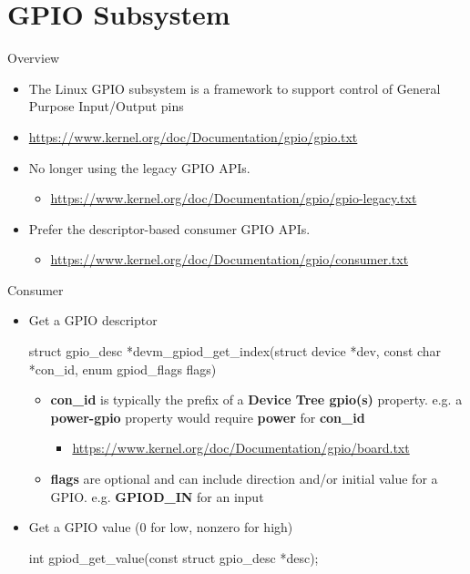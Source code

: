 \section{GPIO Subsystem}

\begin{frame}
   {Overview}

   \begin{itemize}
      \item
	      The Linux GPIO subsystem is a framework to support control of General Purpose Input/Output pins
      \item
		\url{https://www.kernel.org/doc/Documentation/gpio/gpio.txt}
      \item
	      No longer using the legacy GPIO APIs.
		   \begin{itemize}
			   \item 
				   \url{https://www.kernel.org/doc/Documentation/gpio/gpio-legacy.txt}
		   \end{itemize}
      \item
	      Prefer the descriptor-based consumer GPIO APIs.
		   \begin{itemize}
			   \item
				   \url{https://www.kernel.org/doc/Documentation/gpio/consumer.txt}
		   \end{itemize}
   \end{itemize}
\end{frame}

\begin{frame}
	{Consumer}

	\begin{itemize}
		\item
			Get a GPIO descriptor
			\begin{raw}
struct gpio_desc *devm_gpiod_get_index(struct device *dev,
				       const char *con_id,
			               enum gpiod_flags flags)
			\end{raw}
			\begin{itemize}
		\item
			\textbf{con\_id} is typically the prefix of a \textbf{Device Tree gpio(s)} property. e.g. a \textbf{power-gpio} property would require \textbf{power} for \textbf{con\_id}
					\begin{itemize}
						\item
							\url{https://www.kernel.org/doc/Documentation/gpio/board.txt}
					\end{itemize}
		\item
			\textbf{flags} are optional and can include direction and/or initial value for a GPIO. e.g. \textbf{GPIOD\_IN} for an input
			\end{itemize}
		\item
			Get a GPIO value (0 for low, nonzero for high)
			\begin{raw}
int gpiod_get_value(const struct gpio_desc *desc);
			\end{raw}
	\end{itemize}
\end{frame}
